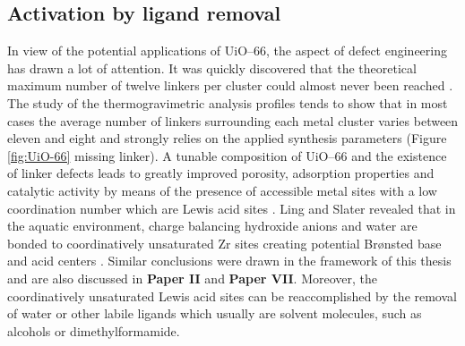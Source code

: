 \newpage
\subsection*{Activation by ligand removal}
In view of the potential applications of UiO--66, the aspect of defect
engineering has drawn a lot of attention. It was quickly discovered that the
theoretical maximum number of twelve linkers per cluster could almost never been
reached \cite{Valenzano2011,Shearer2014}. The study of the thermogravimetric
analysis profiles tends to show that in most cases the average number of linkers surrounding each metal cluster varies between eleven and eight
and strongly relies on the applied synthesis parameters (Figure \ref{fig:UiO-66}
missing linker).
A tunable composition of UiO--66 and the existence of linker defects leads to
greatly improved porosity, adsorption properties and catalytic activity by means of the presence of accessible metal sites with a low coordination number which
are Lewis acid sites \cite{Wu2013, Shearer2014, Vermoortele2013,Vandichel2015,
Liu2016}. Ling and Slater revealed that in the aquatic environment, charge
balancing hydroxide anions and water are bonded to coordinatively unsaturated Zr
sites creating potential Br\o{}nsted base and acid centers \cite{Ling2016}.
Similar conclusions were drawn in the framework of this thesis and are also
discussed in \textbf{Paper II} and \textbf{Paper VII}.
Moreover, the coordinatively unsaturated Lewis acid sites can be reaccomplished
by the removal of water or other labile ligands which usually are solvent molecules, such as alcohols or dimethylformamide. 


